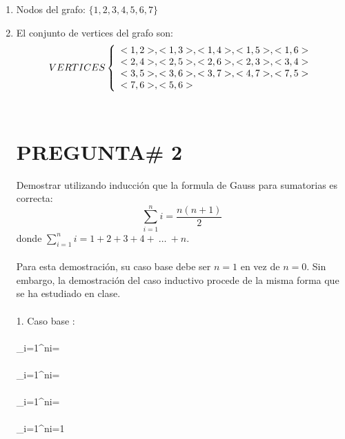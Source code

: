 \documentclass{article}
\begin{document}
\begin{enumerate}
\item Nodos del grafo: $\{1,2,3,4,5,6,7\}$

\item {El conjunto de vertices del grafo son:}
\[
        VERTICES \left\{
        \begin{array}{l l}
          <1,2>, <1,3>, <1,4>, <1,5>, <1,6> \\
          <2,4>, <2,5>, <2,6>, <2,3>, <3,4> \\
          <3,5>, <3,6>, <3,7>, <4,7>, <7,5> \\
          <7,6>, <5,6> \\
        \end{array}
        \right.
    \]
\\ \section{PREGUNTA\# 2}
Demostrar utilizando inducci\'on que la formula de Gauss para sumatorias es correcta:
\[
        \sum_{i=1}^{n}{i}=\frac{n(n+1)}{2}
\]
donde $\sum_{i=1}^{n}i=1+2+3+4+\ \ldots\ +n$.
\\\\
Para esta demostraci\'on, su caso base debe ser
$n=1$ en vez de $n=0$. Sin embargo, la demostraci\'on
del caso inductivo procede de la misma forma que
se ha estudiado en clase.
\\\\ 1. {Caso base :
\\\\ \sum_{i=1}^{n}{i}= 
\\\\\sum_{i=1}^{n}{i}= 
\\\\\sum_{i=1}^{n}{i}= 
\\\\\sum_{i=1}^{n}{i}={1}}


\end{enumerate}
\end{document}
